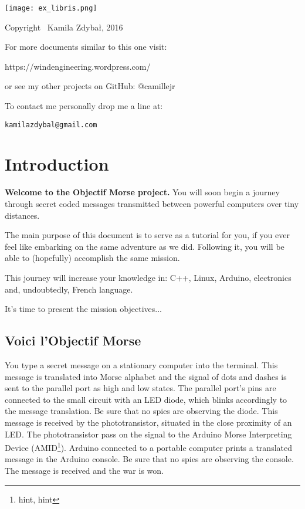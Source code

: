 \documentclass[12pt]{report}
\begin{document}
\thispagestyle{empty}
\begin{center}
    
\vspace*{4cm}

\texttt{[image: ex\_libris.png]}

\vspace*{2cm}

Copyright \textcopyright \, Kamila Zdybał, 2016

For more documents similar to this one visit:

https://windengineering.wordpress.com/

or see my other projects on GitHub: @camillejr

To contact me personally drop me a line at:

\verb|kamilazdybal@gmail.com|

\end{center}
\newpage




\setlength{\parindent}{0cm}
\clearpage

\tableofcontents

\setlength{\parskip}{1em}
\renewcommand{\baselinestretch}{1.0}

\chapter{Introduction}\label{chap:intro}

\textbf{Welcome to the Objectif Morse project.} You will soon begin a journey through secret coded messages transmitted between powerful computers over tiny distances. 

The main purpose of this document is to serve as a tutorial for you, if you ever feel like embarking on the same adventure as we did. Following it, you will be able to (hopefully) accomplish the same mission. 

This journey will increase your knowledge in: C++, Linux, Arduino, electronics and, undoubtedly, French language.

It's time to present the mission objectives...

\section{Voici l'Objectif Morse}

You type a secret message on a stationary computer into the terminal. This message is translated into Morse alphabet and the signal of dots and dashes is sent to the parallel port as high and low states. The parallel port's pins are connected to the small circuit with an LED diode, which blinks accordingly to the message translation. Be sure that no spies are observing the diode. This message is received by the phototransistor, situated in the close proximity of an LED. The phototransistor pass on the signal to the Arduino Morse Interpreting Device (AMID\footnote{hint, hint}). Arduino connected to a portable computer prints a translated message in the Arduino console. Be sure that no spies are observing the console. The message is received and the war is won.
\end{document}
